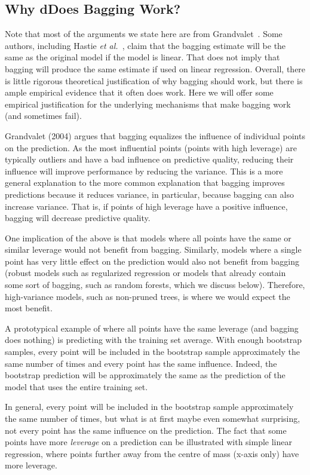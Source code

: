 \subsection*{Why dDoes Bagging Work?}

Note that most of the arguments we state here are from Grandvalet~\cite{Grandvalet2004}. Some authors, including Hastie {\em et al.}~\cite{2016-Hastie}, claim that the bagging estimate will be the same as the original model if the model is linear. That does not imply that bagging will produce the same estimate if used on linear regression. Overall, there is little rigorous theoretical justification of why bagging should work, but there is ample empirical evidence that it often does work. Here we will offer some empirical justification for the underlying mechanisms that make bagging work (and sometimes fail).

Grandvalet (2004) argues that bagging equalizes the influence of individual points on the prediction. As the most influential points (points with high leverage) are typically outliers and have a bad influence on predictive quality, reducing their influence will improve performance by reducing the variance. This is a more general explanation to the more common explanation that bagging improves predictions because it reduces variance, in particular, because bagging can also increase variance. That is, if points of high leverage have a positive influence, bagging will decrease predictive quality.

One implication of the above is that models where all points have the same or similar leverage would not benefit from bagging. Similarly, models where a single point has very little effect on the prediction would also not benefit from bagging (robust models such as regularized regression or models that already contain some sort of bagging, such as random forests, which we discuss below). Therefore, high-variance models, such as non-pruned trees, is where we would expect the most benefit.

A prototypical example of where all points have the same leverage (and bagging does nothing) is predicting with the training set average. With enough bootstrap samples, every point will be included in the bootstrap sample approximately the same number of times and every point has the same influence. Indeed, the bootstrap prediction will be approximately the same as the prediction of the model that uses the entire training set.

In general, every point will be included in the bootstrap sample approximately the same number of times, but what is at first maybe even somewhat surprising, not every point has the same influence on the prediction. The fact that some points have more {\em leverage} on a prediction can be illustrated with simple linear regression, where points further away from the centre of mass (x-axis only) have more leverage. 

